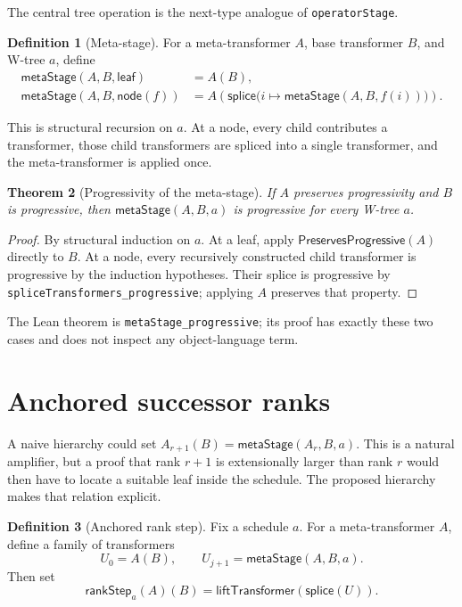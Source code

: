\documentclass[11pt]{article}
\newtheorem{theorem}{Theorem}[section]
\theoremstyle{definition}
\newtheorem{definition}[theorem]{Definition}
\theoremstyle{remark}
\newcommand{\Pres}{\mathsf{PreservesProgressive}}
\newcommand{\lean}[1]{\texttt{#1}}
\begin{document}
The central tree operation is the next-type analogue of
\lean{operatorStage}.

\begin{definition}[Meta-stage]
For a meta-transformer \(A\), base transformer \(B\), and W-tree \(a\), define
\[
\begin{aligned}
\mathsf{metaStage}(A,B,\mathsf{leaf})
  &= A(B),\\
\mathsf{metaStage}(A,B,\mathsf{node}(f))
  &= A\!\left(\mathsf{splice}
       \bigl(i\mapsto\mathsf{metaStage}(A,B,f(i))\bigr)\right).
\end{aligned}
\]
\end{definition}

This is structural recursion on \(a\).  At a node, every child contributes a
transformer, those child transformers are spliced into a single transformer,
and the meta-transformer is applied once.

\begin{theorem}[Progressivity of the meta-stage]
If \(A\) preserves progressivity and \(B\) is progressive, then
\(\mathsf{metaStage}(A,B,a)\) is progressive for every W-tree \(a\).
\end{theorem}

\begin{proof}
By structural induction on \(a\).  At a leaf, apply \(\Pres(A)\) directly to
\(B\).  At a node, every recursively constructed child transformer is
progressive by the induction hypotheses.  Their splice is progressive by
\lean{spliceTransformers\_progressive}; applying \(A\) preserves that
property.
\end{proof}

The Lean theorem is \lean{metaStage\_progressive}; its proof has exactly these
two cases and does not inspect any object-language term.

\section{Anchored successor ranks}

A naive hierarchy could set
\(A_{r+1}(B)=\mathsf{metaStage}(A_r,B,a)\).  This is a natural amplifier, but a
proof that rank \(r+1\) is extensionally larger than rank \(r\) would then have
to locate a suitable leaf inside the schedule.  The proposed hierarchy makes
that relation explicit.

\begin{definition}[Anchored rank step]
Fix a schedule \(a\).  For a meta-transformer \(A\), define a family of
transformers
\[
  U_0=A(B),\qquad
  U_{j+1}=\mathsf{metaStage}(A,B,a).
\]
Then set
\[
  \mathsf{rankStep}_a(A)(B)
  =\mathsf{liftTransformer}(\mathsf{splice}(U)).
\]
\end{definition}
\end{document}
